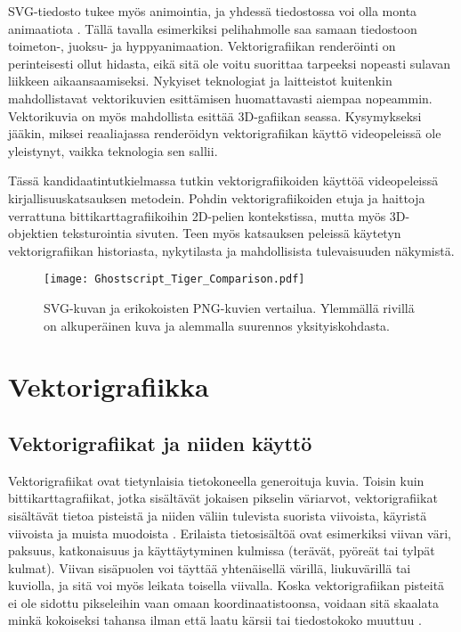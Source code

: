 \documentclass[utf8,bachelor]{gradu3}
\begin{document}
SVG-tiedosto tukee myös animointia, ja yhdessä tiedostossa voi olla monta animaatiota \parencite{RefWorks:doc:5bd74719e4b0e42e08f6333b}. Tällä tavalla esimerkiksi pelihahmolle saa samaan tiedostoon toimeton-, juoksu- ja hyppyanimaation. Vektorigrafiikan renderöinti on perinteisesti ollut hidasta, eikä sitä ole voitu suorittaa tarpeeksi nopeasti sulavan liikkeen aikaansaamiseksi. Nykyiset teknologiat ja laitteistot kuitenkin mahdollistavat vektorikuvien esittämisen huomattavasti aiempaa nopeammin. Vektorikuvia on myös mahdollista esittää 3D-gafiikan seassa. \parencite{RefWorks:doc:5bc4a5cce4b080e02f7eff1b} Kysymykseksi jääkin, miksei reaaliajassa renderöidyn vektorigrafiikan käyttö videopeleissä ole yleistynyt, vaikka teknologia sen sallii.

Tässä kandidaatintutkielmassa tutkin vektorigrafiikoiden käyttöä videopeleissä kirjallisuuskatsauksen metodein. Pohdin vektorigrafiikoiden etuja ja haittoja verrattuna bittikarttagrafiikoihin 2D-pelien kontekstissa, mutta myös 3D-objektien teksturointia sivuten. Teen myös katsauksen peleissä käytetyn vektorigrafiikan historiasta, nykytilasta ja mahdollisista tulevaisuuden näkymistä.

\begin{figure}[!b]
	\centering
	\texttt{[image: Ghostscript\_Tiger\_Comparison.pdf]}
    \caption{SVG-kuvan ja erikokoisten PNG-kuvien vertailua. Ylemmällä rivillä on alkuperäinen kuva ja alemmalla suurennos yksityiskohdasta.}\label{vertailu}
\end{figure}

\chapter{Vektorigrafiikka}

\section{Vektorigrafiikat ja niiden käyttö}\label{määrittely}


Vektorigrafiikat ovat tietynlaisia tietokoneella generoituja kuvia. Toisin kuin bittikarttagrafiikat, jotka sisältävät jokaisen pikselin väriarvot, vektorigrafiikat sisältävät tietoa pisteistä ja niiden väliin tulevista suorista viivoista, käyristä viivoista ja muista muodoista \parencites{RefWorks:doc:5bdc5224e4b05afcfde5b159}{RefWorks:doc:5bdc5292e4b05afcfde5b171}. Erilaista tietosisältöä ovat esimerkiksi viivan väri, paksuus, katkonaisuus ja käyttäytyminen kulmissa (terävät, pyöreät tai tylpät kulmat). Viivan sisäpuolen voi täyttää yhtenäisellä värillä, liukuvärillä tai kuviolla, ja sitä voi myös leikata toisella viivalla. \parencite{RefWorks:doc:5bd74719e4b0e42e08f6333b} Koska vektorigrafiikan pisteitä ei ole sidottu pikseleihin vaan omaan koordinaatistoonsa, voidaan sitä skaalata minkä kokoiseksi tahansa ilman että laatu kärsii tai tiedostokoko muuttuu \parencite{RefWorks:doc:5bdc5292e4b05afcfde5b171}.
\end{document}
